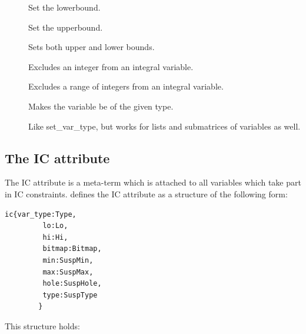 \begin{description}
\item[]
Set the lowerbound.
\item[]
Set the upperbound.
\item[]
Sets both upper and lower bounds.
\item[]
Excludes an integer from an integral variable.
\item[]
Excludes a range of integers from an integral variable.
\item[]
Makes the variable be of the given type.
\item[]
Like set_var_type, but works for lists and submatrices of variables as well.
\end{description}

\subsection{The IC attribute}

The IC attribute is a meta-term which is attached to all variables which
take part in IC constraints.
 defines the IC
attribute as a structure of the following form:
\begin{verbatim}
ic{var_type:Type,
         lo:Lo,
         hi:Hi,
         bitmap:Bitmap,
         min:SuspMin,
         max:SuspMax,
         hole:SuspHole,
         type:SuspType
        }
\end{verbatim}


This structure holds:

